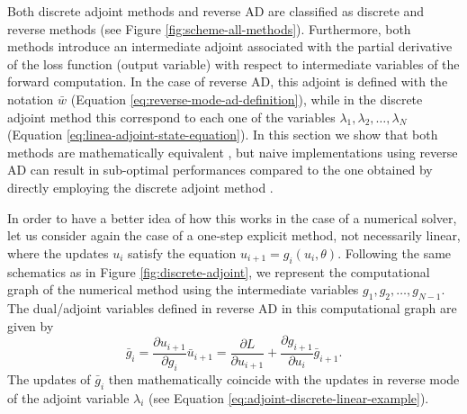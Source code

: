 Both discrete adjoint methods and reverse AD are classified as discrete and reverse methods (see Figure \ref{fig:scheme-all-methods}). 
Furthermore, both methods introduce an intermediate adjoint associated with the partial derivative of the loss function (output variable) with respect to intermediate variables of the forward computation.
In the case of reverse AD, this adjoint is defined with the notation $\bar w$ (Equation \eqref{eq:reverse-mode-ad-definition}), while in the discrete adjoint method this correspond to each one of the variables $\lambda_1, \lambda_2, \ldots, \lambda_N$ (Equation \eqref{eq:linea-adjoint-state-equation}).
In this section we show that both methods are mathematically equivalent \cite{Zhu_Xu_Darve_Beroza_2021, li2020coupled}, but naive implementations using reverse AD can result in sub-optimal performances compared to the one obtained by directly employing the discrete adjoint method \cite{Alexe_Sandu_2009}. 

In order to have a better idea of how this works in the case of a numerical solver, let us consider again the case of a one-step explicit method, not necessarily linear, where the updates $u_{i}$ satisfy the equation $u_{i+1} = g_{i}(u_{i}, \theta)$.
Following the same schematics as in Figure \ref{fig:discrete-adjoint}, we represent the computational graph of the numerical method using the intermediate variables $g_1, g_2, \ldots, g_{N-1}$.
The dual/adjoint variables defined in reverse AD in this computational graph are given by 
\begin{equation}
    \bar g_i
    = 
    \frac{\partial u_{i+1}}{\partial g_i} \bar u_{i+1}
    = 
    \frac{\partial L}{\partial u_{i+1}} 
    +
    \frac{\partial g_{i+1}}{\partial u_i} \bar g_{i+1}.
\end{equation}
The updates of $\bar g_i$ then mathematically coincide with the updates in reverse mode of the adjoint variable $\lambda_i$ (see Equation \eqref{eq:adjoint-discrete-linear-example}).

